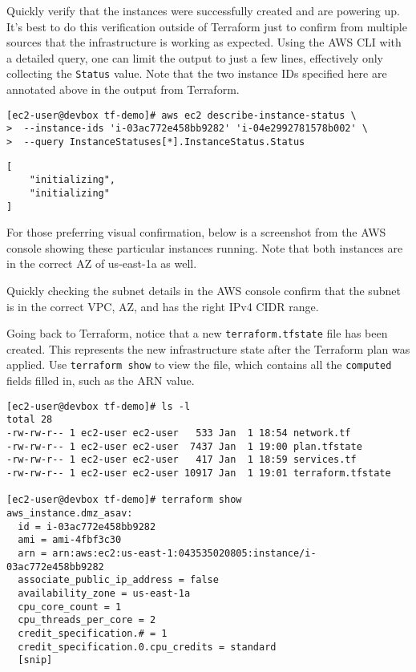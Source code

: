 Quickly verify that the instances were successfully created and are powering
up. It's best to do this verification outside of Terraform just to confirm
from multiple sources that the infrastructure is working as expected\@. Using
the AWS CLI with a detailed query, one can limit the output to just a few
lines, effectively only collecting the \verb|Status| value. Note that the two
instance IDs specified here are annotated above in the output from Terraform.

\begin{verbatim}
[ec2-user@devbox tf-demo]# aws ec2 describe-instance-status \
>  --instance-ids 'i-03ac772e458bb9282' 'i-04e2992781578b002' \
>  --query InstanceStatuses[*].InstanceStatus.Status
\end{verbatim}

\begin{verbatim}
[
    "initializing",
    "initializing"
]
\end{verbatim}

For those preferring visual confirmation, below is a screenshot from the AWS
console showing these particular instances running. Note that both instances
are in the correct AZ of us-east-1a as well.


Quickly checking the subnet details in the AWS console confirm that the subnet
is in the correct VPC, AZ, and has the right IPv4 CIDR range.


Going back to Terraform, notice that a new \verb|terraform.tfstate| file has
been created. This represents the new infrastructure state after the Terraform
plan was applied. Use \verb|terraform show| to view the file, which contains
all the \verb|computed| fields filled in, such as the ARN value.

\begin{verbatim}
[ec2-user@devbox tf-demo]# ls -l
total 28
-rw-rw-r-- 1 ec2-user ec2-user   533 Jan  1 18:54 network.tf
-rw-rw-r-- 1 ec2-user ec2-user  7437 Jan  1 19:00 plan.tfstate
-rw-rw-r-- 1 ec2-user ec2-user   417 Jan  1 18:59 services.tf
-rw-rw-r-- 1 ec2-user ec2-user 10917 Jan  1 19:01 terraform.tfstate

[ec2-user@devbox tf-demo]# terraform show
aws_instance.dmz_asav:
  id = i-03ac772e458bb9282
  ami = ami-4fbf3c30
  arn = arn:aws:ec2:us-east-1:043535020805:instance/i-03ac772e458bb9282
  associate_public_ip_address = false
  availability_zone = us-east-1a
  cpu_core_count = 1
  cpu_threads_per_core = 2
  credit_specification.# = 1
  credit_specification.0.cpu_credits = standard
  [snip]
\end{verbatim}


